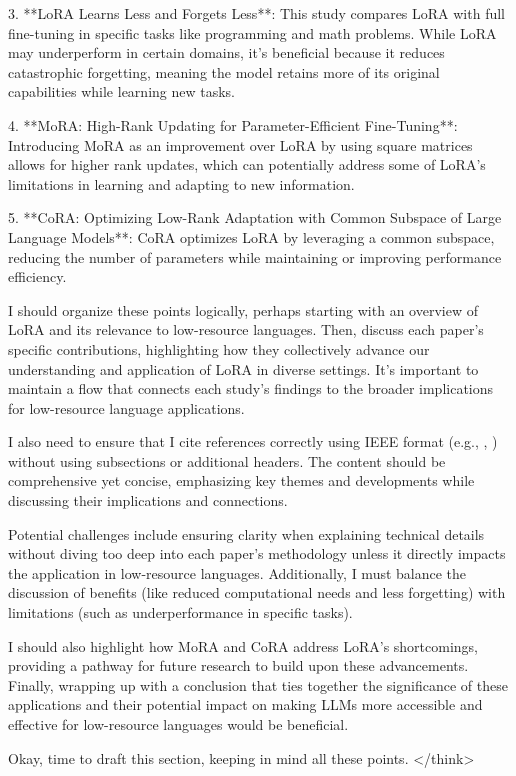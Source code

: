 \documentclass[conference]{IEEEtran}
\begin{document}
3. **LoRA Learns Less and Forgets Less**: This study compares LoRA with full fine-tuning in specific tasks like programming and math problems. While LoRA may underperform in certain domains, it's beneficial because it reduces catastrophic forgetting, meaning the model retains more of its original capabilities while learning new tasks.

4. **MoRA: High-Rank Updating for Parameter-Efficient Fine-Tuning**: Introducing MoRA as an improvement over LoRA by using square matrices allows for higher rank updates, which can potentially address some of LoRA's limitations in learning and adapting to new information.

5. **CoRA: Optimizing Low-Rank Adaptation with Common Subspace of Large Language Models**: CoRA optimizes LoRA by leveraging a common subspace, reducing the number of parameters while maintaining or improving performance efficiency.

I should organize these points logically, perhaps starting with an overview of LoRA and its relevance to low-resource languages. Then, discuss each paper's specific contributions, highlighting how they collectively advance our understanding and application of LoRA in diverse settings. It's important to maintain a flow that connects each study's findings to the broader implications for low-resource language applications.

I also need to ensure that I cite references correctly using IEEE format (e.g., \cite{b1}, \cite{b2}) without using subsections or additional headers. The content should be comprehensive yet concise, emphasizing key themes and developments while discussing their implications and connections.

Potential challenges include ensuring clarity when explaining technical details without diving too deep into each paper's methodology unless it directly impacts the application in low-resource languages. Additionally, I must balance the discussion of benefits (like reduced computational needs and less forgetting) with limitations (such as underperformance in specific tasks).

I should also highlight how MoRA and CoRA address LoRA's shortcomings, providing a pathway for future research to build upon these advancements. Finally, wrapping up with a conclusion that ties together the significance of these applications and their potential impact on making LLMs more accessible and effective for low-resource languages would be beneficial.

Okay, time to draft this section, keeping in mind all these points.
</think>
\end{document}
